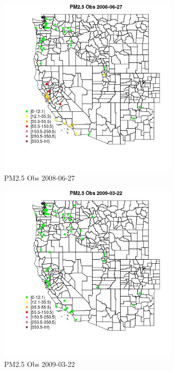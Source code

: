 \begin{figure} 
\centering  
\includegraphics[width=0.77\textwidth]{Code_Outputs/Report_ML_input_PM25_Step4_part_e_de_duplicated_aves_MapObsPM25_Obs2008-06-27.jpg} 
\caption{\label{fig:Report_ML_input_PM25_Step4_part_e_de_duplicated_avesMapObsPM25_Obs2008-06-27}PM2.5 Obs 2008-06-27} 
\end{figure} 
 

\begin{figure} 
\centering  
\includegraphics[width=0.77\textwidth]{Code_Outputs/Report_ML_input_PM25_Step4_part_e_de_duplicated_aves_MapObsPM25_Obs2009-03-22.jpg} 
\caption{\label{fig:Report_ML_input_PM25_Step4_part_e_de_duplicated_avesMapObsPM25_Obs2009-03-22}PM2.5 Obs 2009-03-22} 
\end{figure} 
 

